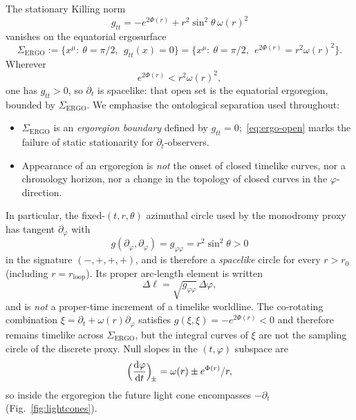 \documentclass{iopjournal}
\newcommand{\Phir}{\Phi(r)}
\newcommand{\omegar}{\omega(r)}
\theoremstyle{remark}
\begin{document}
The stationary Killing norm
\begin{equation}
\label{eq:gtt}
g_{tt}=-e^{2\Phir}+r^{2}\sin^{2}\theta\,\omegar^{2}
\end{equation}
vanishes on the equatorial ergosurface
\begin{equation}
\label{eq:Sigma-ERGO}
\Sigma_{\mathrm{ERGO}}
:=\bigl\{x^{\mu}:\ \theta=\pi/2,\ \ g_{tt}(x)=0\bigr\}
=\bigl\{x^{\mu}:\ \theta=\pi/2,\ \ e^{2\Phir}=r^{2}\omegar^{2}\bigr\}.
\end{equation}
Wherever
\begin{equation}
\label{eq:ergo-open}
e^{2\Phir} < r^{2}\omegar^{2},
\end{equation}
one has $g_{tt}>0$, so $\partial_{t}$ is spacelike: that open set is the equatorial ergoregion, bounded by $\Sigma_{\mathrm{ERGO}}$.
We emphasise the ontological separation used throughout:
\begin{itemize}
  \item $\Sigma_{\mathrm{ERGO}}$ is an \emph{ergoregion boundary} defined by $g_{tt}=0$;~\eqref{eq:ergo-open} marks the failure of static stationarity for $\partial_{t}$-observers.
  \item Appearance of an ergoregion is \emph{not} the onset of closed timelike curves, nor a chronology horizon, nor a change in the topology of closed curves in the $\varphi$-direction.
\end{itemize}
In particular, the fixed-$(t,r,\theta)$ azimuthal circle used by the monodromy proxy has tangent $\partial_{\varphi}$ with
\begin{equation}
\label{eq:gphiphi}
g(\partial_{\varphi},\partial_{\varphi})
=
g_{\varphi\varphi}
=
r^{2}\sin^{2}\theta
>0
\end{equation}
in the signature $(-,+,+,+)$, and is therefore a \emph{spacelike} circle for every $r>r_{0}$ (including $r=r_{\mathrm{loop}}$).
Its proper arc-length element is written
\begin{equation}
\label{eq:Delta-ell}
\Delta\ell
=
\sqrt{g_{\varphi\varphi}}\,\Delta\varphi,
\end{equation}
and is \emph{not} a proper-time increment of a timelike worldline.
The co-rotating combination $\xi=\partial_{t}+\omegar\partial_{\varphi}$ satisfies $g(\xi,\xi)=-e^{2\Phir}<0$ and therefore remains timelike across $\Sigma_{\mathrm{ERGO}}$, but the integral curves of $\xi$ are not the sampling circle of the discrete proxy.
Null slopes in the $(t,\varphi)$ subspace are
\begin{equation}
\label{eq:null-slopes}
\Bigl(\frac{\mathrm{d}\varphi}{\mathrm{d}t}\Bigr)_{\!\pm}=\omegar\pm e^{\Phir}/r,
\end{equation}
so inside the ergoregion the future light cone encompasses $-\partial_{t}$ (Fig.~\ref{fig:lightcones}).
\end{document}
